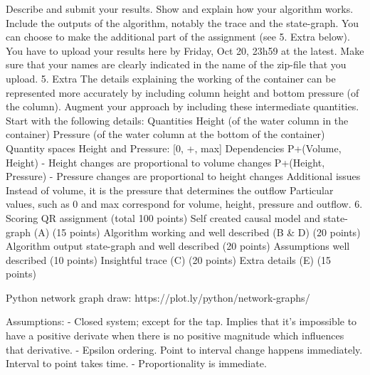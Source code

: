Describe and submit your results. Show and explain how your algorithm works. Include the outputs of the algorithm, notably the trace and the state-graph.
You can choose to make the additional part of the assignment (see 5. Extra below).
You have to upload your results here by Friday, Oct 20, 23h59 at the latest. Make sure that your names are clearly indicated in the name of the zip-file that you upload.
5. Extra
The details explaining the working of the container can be represented more accurately by including column height and bottom pressure (of the column). Augment your approach by including these intermediate quantities. Start with the following details:
Quantities
Height (of the water column in the container)
Pressure (of the water column at the bottom of the container)
Quantity spaces
Height and Pressure: [0, +, max]
Dependencies
P+(Volume, Height) - Height changes are proportional to volume changes
P+(Height, Pressure) - Pressure changes are proportional to height changes
Additional issues
Instead of volume, it is the pressure that determines the outflow
Particular values, such as 0 and max correspond for volume, height, pressure and outflow.
6. Scoring QR assignment (total 100 points)
Self created causal model and state-graph (A) (15 points)
Algorithm working and well described (B & D) (20 points)
Algorithm output state-graph and well described (20 points)
Assumptions well described (10 points)
Insightful trace (C) (20 points)
Extra details (E) (15 points)

Python network graph draw: https://plot.ly/python/network-graphs/

Assumptions:
- Closed system; except for the tap. Implies that it's impossible to have a positive derivate when there is no positive magnitude which influences that derivative.
- Epsilon ordering. Point to interval change happens immediately. Interval to point takes time.
- Proportionality is immediate.
